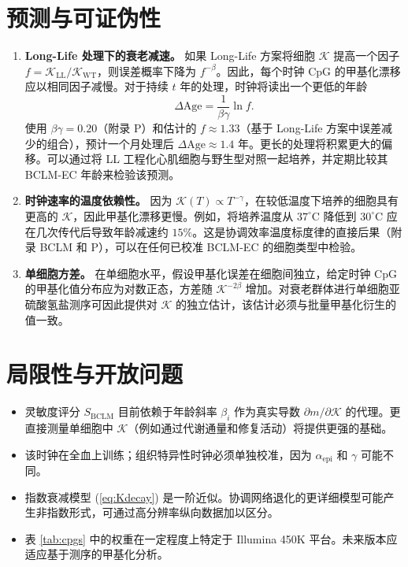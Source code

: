 \documentclass[12pt,a4paper,fontset=fandol]{ctexart}
\newcommand{\REL}{\mathcal{K}}          %
\begin{document}
	\section{预测与可证伪性}
	\label{sec:predictions}
	
	\begin{enumerate}
		\item \textbf{Long-Life 处理下的衰老减速。}
		如果 Long-Life 方案将细胞 \(\REL\) 提高一个因子 \(f = \REL_{\mathrm{LL}}/\REL_{\mathrm{WT}}\)，则误差概率下降为 \(f^{-\beta}\)。因此，每个时钟 CpG 的甲基化漂移应以相同因子减慢。对于持续 \(t\) 年的处理，时钟将读出一个更低的年龄
		\[
		\Delta\mathrm{Age} = \frac{1}{\beta\gamma} \ln f.
		\]
		使用 \(\beta\gamma = 0.20\)（附录 P）和估计的 \(f \approx 1.33\)（基于 Long-Life 方案中误差减少的组合），预计一个月处理后 \(\Delta\mathrm{Age} \approx 1.4\) 年。更长的处理将积累更大的偏移。可以通过将 LL 工程化心肌细胞与野生型对照一起培养，并定期比较其 BCLM-EC 年龄来检验该预测。
		
		\item \textbf{时钟速率的温度依赖性。}
		因为 \(\REL(T) \propto T^{-\gamma}\)，在较低温度下培养的细胞具有更高的 \(\REL\)，因此甲基化漂移更慢。例如，将培养温度从 \(37^\circ\text{C}\) 降低到 \(30^\circ\text{C}\) 应在几次传代后导致年龄减速约 \(15\%\)。这是协调效率温度标度律的直接后果（附录 BCLM 和 P），可以在任何已校准 BCLM-EC 的细胞类型中检验。
		
		\item \textbf{单细胞方差。}
		在单细胞水平，假设甲基化误差在细胞间独立，给定时钟 CpG 的甲基化值分布应为对数正态，方差随 \(\REL^{-2\beta}\) 增加。对衰老群体进行单细胞亚硫酸氢盐测序可因此提供对 \(\REL\) 的独立估计，该估计必须与批量甲基化衍生的值一致。
	\end{enumerate}
	
	\section{局限性与开放问题}
	\label{sec:limitations}
	\begin{itemize}
		\item 灵敏度评分 \(S_{\mathrm{BCLM}}\) 目前依赖于年龄斜率 \(\beta_i\) 作为真实导数 \(\partial m/\partial \REL\) 的代理。更直接测量单细胞中 \(\REL\)（例如通过代谢通量和修复活动）将提供更强的基础。
		\item 该时钟在全血上训练；组织特异性时钟必须单独校准，因为 \(\alpha_{\mathrm{epi}}\) 和 \(\gamma\) 可能不同。
		\item 指数衰减模型 (\ref{eq:Kdecay}) 是一阶近似。协调网络退化的更详细模型可能产生非指数形式，可通过高分辨率纵向数据加以区分。
		\item 表 \ref{tab:cpgs} 中的权重在一定程度上特定于 Illumina 450K 平台。未来版本应适应基于测序的甲基化分析。
	\end{itemize}
	
\end{document}
